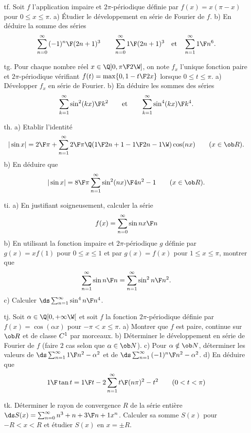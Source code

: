 \exo [Level=2,Fight=0,Learn=0,Type=\Exercices,Field=\SériesDeFourier,Origin=] tf. 
Soit $f$ l'application impaire et $2\pi$-périodique définie par $f(x)=x(\pi-x)$ 
pour $0\le x\le\pi$. \pn
a) Étudier le développement en série de Fourier de $f$. \pn
b) En déduire la somme des séries 
$$
\sum_{n=0}^\infty{(-1)^n\F(2n+1)^3}\qquad\sum_{n=0}^\infty{1\F(2n+1)^3}
\quad\hbox{et}\quad\sum_{n=1}^\infty{1\F n^6}. 
$$

\exo [Level=2,Fight=0,Learn=0,Type=\Exercices,Field=\SériesDeFourier,Origin=] tg. 
Pour chaque nombre réel $x\in\Q]0,{\pi\F2}\W]$, on note $f_x$ 
l'unique fonction paire et $2\pi$-périodique vérifiant $f(t)=\max\{0, 1-{t\F2x}\}$ lorsque $0\le t\le \pi$. \pn
a) Développer $f_x$ en série de Fourier.\pn 
b) En déduire les sommes des séries 
$$
\sum_{k=1}^\infty{\sin^2(kx)\F k^2}\qquad\hbox{et}\qquad\sum_{k=1}^\infty{\sin^4(kx)\F k^4}.
$$

\exo [Level=2,Fight=0,Learn=0,Type=\Exercices,Field=\SériesDeFourier,Origin=] th. 
a) Etablir l'identité 
$$
|\sin x|={2\F\pi}+\sum_{n=1}^\infty{2\F\pi}\Q({1\F2n+1}-{1\F2n-1}\W)\cos(nx)\qquad(x\in\ob R).
$$
b) En déduire que 
$$
|\sin x|={8\F\pi}\sum_{n=1}^\infty{\sin^2(nx)\F4n^2-1}\qquad(x\in\ob R).
$$  

\exo [Level=2,Fight=0,Learn=0,Type=\Exercices,Field=\SériesDeFourier,Origin=] ti. 
a) En justifiant soigneusement, calculer la série
$$
f(x)=\sum_{n=0}^\infty{\sin nx\F n}
$$
b) En utilisant la fonction impaire et $2\pi$-périodique $g$ définie par 
$g(x)=xf(1)$ pour $0\le x\le 1$ et par $g(x)=f(x)$ pour $1\le x\le \pi$, montrer que 
$$
\sum_{n=1}^\infty{\sin n\F n}=\sum_{n=1}^\infty{\sin^2n\F n^2}. 
$$ 
c) Calculer $\ds \sum_{n=1}^\infty{\sin^4 n\F n^4}$. 

\exo [Level=2,Fight=0,Learn=0,Type=\Exercices,Field=\SériesDeFourier,Origin=] tj. 
Soit $\alpha\in\Q[0,+\infty\W[$ et soit $f$ la fonction $2\pi$-périodique 
définie par $f(x)=\cos (\alpha x)$ 
pour $-\pi< x\le \pi$. \pn
a) Montrer que $f$ est paire, continue sur $\ob R$ et de classe $\sc C^1$ 
par morceaux. \pn
b) Déterminer le développement en série de Fourier de $f$ (faire $2$ 
cas selon que $\alpha\in\ob N$). \pn
c) Pour $\alpha\notin\ob N$, déterminer les valeurs de $\ds \sum_{n=1}^\infty{1\F n^2-\alpha^2}$ 
et de 
$\ds \sum_{n=1}^\infty{(-1)^n\F n^2-\alpha^2}$. \pn
d) En déduire que 
$$
{1\F\tan t}={1\F t}-2\sum_{n=1}^\infty{t\F (n\pi)^2-t^2}\qquad(0<t<\pi)
$$

\exo [Level=2,Fight=0,Learn=0,Type=\Exercices,Field=\SériesEntières,Origin=] tk. 
Déterminer le rayon de convergence $R$ de la série entière 
$\ds S(x)=\sum_{n=0}^\infty{n^3+n+3\F n+1}x^n$. Calculer sa somme $S(x)$ pour $-R<x<R$ 
et étudier $S(x)$ en $x=\pm R$. 

